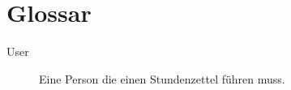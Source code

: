 \section{Glossar}
\begin{description}
    \item[User] Eine Person die einen Stundenzettel führen muss.

\end{description}
